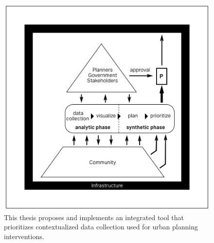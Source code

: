 \begin{figure}[!htb]
 	\includegraphics[width=\textwidth]{chapters/1/fig/bikebump.png}               
 	 \caption[diagram: bikebump]{This thesis proposes and implements an integrated tool that prioritizes contextualized data collection used for urban planning interventions.}
  	\label{fig:diagram_bikebump}
\end{figure}


